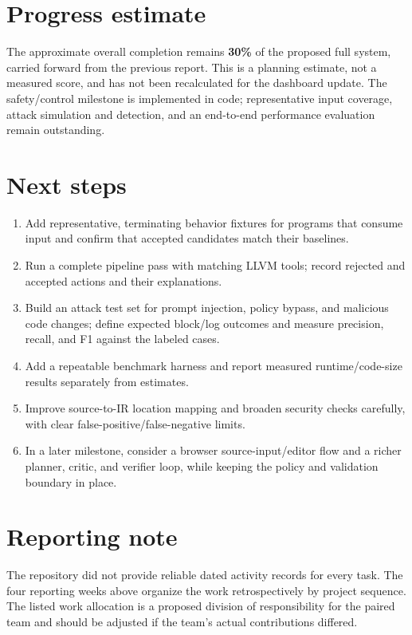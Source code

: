 \documentclass[11pt]{article}
\begin{document}
\section{Progress estimate}
The approximate overall completion remains \textbf{30\%} of the proposed full system, carried forward from the previous report. This is a planning estimate, not a measured score, and has not been recalculated for the dashboard update. The safety/control milestone is implemented in code; representative input coverage, attack simulation and detection, and an end-to-end performance evaluation remain outstanding.

\section{Next steps}
\begin{enumerate}[leftmargin=1.5em,itemsep=2pt]
  \item Add representative, terminating behavior fixtures for programs that consume input and confirm that accepted candidates match their baselines.
  \item Run a complete pipeline pass with matching LLVM tools; record rejected and accepted actions and their explanations.
  \item Build an attack test set for prompt injection, policy bypass, and malicious code changes; define expected block/log outcomes and measure precision, recall, and F1 against the labeled cases.
  \item Add a repeatable benchmark harness and report measured runtime/code-size results separately from estimates.
  \item Improve source-to-IR location mapping and broaden security checks carefully, with clear false-positive/false-negative limits.
  \item In a later milestone, consider a browser source-input/editor flow and a richer planner, critic, and verifier loop, while keeping the policy and validation boundary in place.
\end{enumerate}

\section*{Reporting note}
The repository did not provide reliable dated activity records for every task. The four reporting weeks above organize the work retrospectively by project sequence. The listed work allocation is a proposed division of responsibility for the paired team and should be adjusted if the team's actual contributions differed.
\end{document}
